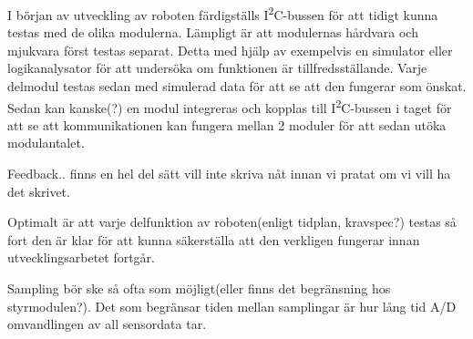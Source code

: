 \documentclass[11pt]{article}
\begin{document}
\begin{flushleft}
I början av utveckling av roboten färdigställs I\textsuperscript{2}C-bussen för att tidigt kunna testas med de olika modulerna. Lämpligt är att modulernas hårdvara och mjukvara först testas separat. Detta med hjälp av exempelvis en simulator eller logikanalysator för att undersöka om funktionen är tillfredsställande. Varje delmodul testas sedan med simulerad data för att se att den fungerar som önskat. Sedan kan kanske(?) en modul integreras och kopplas till I\textsuperscript{2}C-bussen i taget för att se att kommunikationen kan fungera mellan 2 moduler för att sedan utöka modulantalet. 

Feedback.. finns en hel del sätt vill inte skriva nåt innan vi pratat om vi vill ha det skrivet.

Optimalt är att varje delfunktion av roboten(enligt tidplan, kravspec?) testas så fort den är klar för att kunna säkerställa att den verkligen fungerar innan utvecklingsarbetet fortgår.

Sampling bör ske så ofta som möjligt(eller finns det begränsning hos styrmodulen?). Det som begränsar tiden mellan samplingar är hur lång tid A/D omvandlingen av all sensordata tar.




\pagebreak
{}



\end{flushleft}
\end{document}
